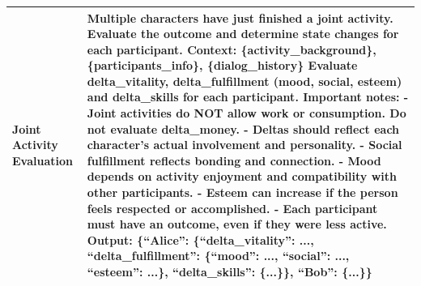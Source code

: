 \begin{table}[h]
\begin{tabular}{p{0.8in}p{4.3in}}
\\
\midrule

\textbf{Joint \newline Activity \newline Evaluation} &

Multiple characters have just finished a joint activity. Evaluate the outcome and determine state changes for each participant.
\vspace{3pt}\newline
\textbf{Context:} \{activity\_background\}, \{participants\_info\}, \{dialog\_history\}
\vspace{3pt}\newline
Evaluate delta\_vitality, delta\_fulfillment (mood, social, esteem) and delta\_skills for each participant.
\vspace{4pt}\newline
\textbf{Important notes:}
\newline - Joint activities do NOT allow work or consumption. Do not evaluate delta\_money.
\newline - Deltas should reflect each character's actual involvement and personality.
\newline - Social fulfillment reflects bonding and connection.
\newline - Mood depends on activity enjoyment and compatibility with other participants.
\newline - Esteem can increase if the person feels respected or accomplished.
\newline - Each participant must have an outcome, even if they were less active.
\vspace{4pt}\newline
\textbf{Output:} \{``Alice'': \{``delta\_vitality'': ..., ``delta\_fulfillment'': \{``mood'': ..., ``social'': ..., ``esteem'': ...\}, ``delta\_skills'': \{...\}\}, ``Bob'': \{...\}\}

\\
\bottomrule
\end{tabular}
\end{table}



